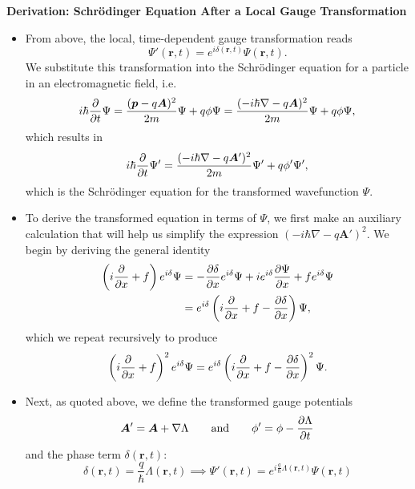 \documentclass[11pt, a4paper]{article}
\renewcommand{\grad}{\nabla}
\newcommand{\eqtext}[1]{\qquad \text{#1} \qquad}
\newcommand{\Schro}{Schr\"{o}dinger\xspace}
\renewcommand{\vec}[1]{\bm{#1}}  %
\renewcommand{\r}{\vec{r}}  %
\newcommand{\A}{\vec{A}}  %
\renewcommand{\P}{\Psi}  %
\begin{document}
\textbf{Derivation: \Schro Equation After a Local Gauge Transformation}
\begin{itemize}
	
	\item From above, the local, time-dependent gauge transformation reads
	\begin{equation*}
		\P'(\r, t) = e^{i\delta (\r, t)} \P(\r, t).
	\end{equation*}
	We substitute this transformation into the \Schro equation for a particle in an electromagnetic field, i.e.
    \begin{equation*}
        i \hbar \pdv{t} \Psi = \frac{(\vec{p} - q\A)^{2}}{2m}\Psi + q \phi \Psi = \frac{(- i \hbar \grad - q\A)^{2}}{2m}\Psi + q \phi \Psi,
    \end{equation*}
    which results in 
	\begin{equation*}
	    i\hbar \pdv{t}\P' = \frac{(-i\hbar \grad - q\A')^{2}}{2m} \P' + q \phi' \P',
	\end{equation*}
    which is the \Schro equation for the transformed wavefunction $ \Psi $.
	
    \item To derive the transformed equation in terms of $ \Psi $, we first make an auxiliary calculation that will help us simplify the expression $ (-i\hbar \grad - q\A')^{2} $. We begin by deriving the general identity
	\begin{align*}
		\left(i\pdv{x} + f\right)e^{i\delta}\P &= - \pdv{\delta}{x} e^{i\delta }\P + ie^{i\delta}\pdv{\P}{x} + fe^{i\delta}\P\\
		& = e^{i\delta}\left(i \pdv{x} + f - \pdv{\delta}{x}\right)\P,
	\end{align*}
    which we repeat recursively to produce
	\begin{equation*}
		\left(i\pdv{x} + f\right)^{2}e^{i\delta}\P = e^{i\delta}\left(i \pdv{x} + f - \pdv{\delta}{x}\right)^{2}\P.
	\end{equation*}

	\item Next, as quoted above, we define the transformed gauge potentials
	\begin{equation*}
		\A' = \A + \grad \Lambda \eqtext{and} \phi' = \phi - \pdv{\Lambda}{t}
	\end{equation*}
    and the phase term $ \delta(\r, t) $:
	\begin{equation*}
		\delta(\r, t) = \frac{q}{\hbar}\Lambda(\r, t) \implies \P'(\r, t) = e^{i\frac{q}{\hbar}\Lambda(\r, t)} \P(\r, t)
	\end{equation*}


\end{itemize}
\end{document}
